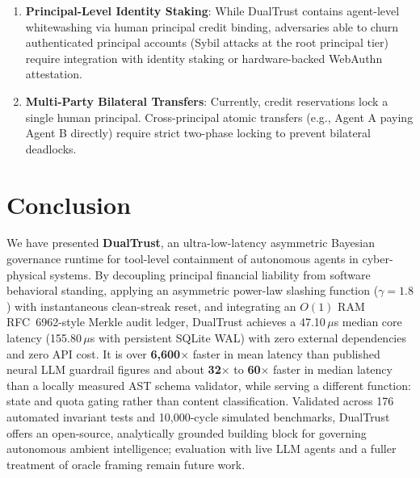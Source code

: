 \documentclass[journal]{IEEEtran}
\begin{document}
\begin{enumerate}[leftmargin=12pt, topsep=2pt, itemsep=1pt]
\item \textbf{Principal-Level Identity Staking}: While DualTrust contains agent-level whitewashing via human principal credit binding, adversaries able to churn authenticated principal accounts (Sybil attacks at the root principal tier) require integration with identity staking or hardware-backed WebAuthn attestation.
\item \textbf{Multi-Party Bilateral Transfers}: Currently, credit reservations lock a single human principal. Cross-principal atomic transfers (e.g., Agent A paying Agent B directly) require strict two-phase locking to prevent bilateral deadlocks.
\end{enumerate}

\section{Conclusion}
\label{sec:conclusion}
We have presented \textbf{DualTrust}, an ultra-low-latency asymmetric Bayesian governance runtime for tool-level containment of autonomous agents in cyber-physical systems. By decoupling principal financial liability from software behavioral standing, applying an asymmetric power-law slashing function ($\gamma = 1.8$) with instantaneous clean-streak reset, and integrating an $O(1)$ RAM RFC~6962-style Merkle audit ledger, DualTrust achieves a 47.10\,$\mu$s median core latency (155.80\,$\mu$s with persistent SQLite WAL) with zero external dependencies and zero API cost. It is over \textbf{6,600$\times$} faster in mean latency than published neural LLM guardrail figures and about \textbf{32$\times$} to \textbf{60$\times$} faster in median latency than a locally measured AST schema validator, while serving a different function: state and quota gating rather than content classification. Validated across 176 automated invariant tests and 10,000-cycle simulated benchmarks, DualTrust offers an open-source, analytically grounded building block for governing autonomous ambient intelligence; evaluation with live LLM agents and a fuller treatment of oracle framing remain future work.
\end{document}
